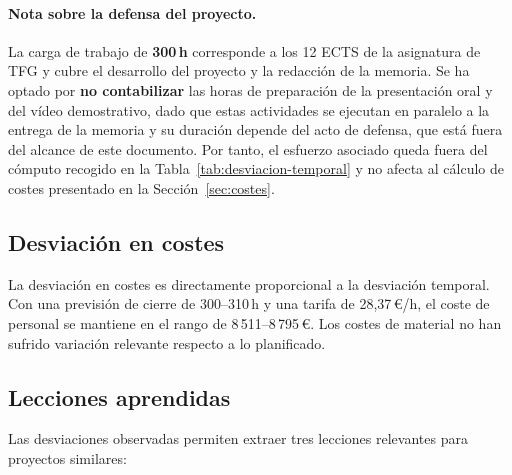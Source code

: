 \paragraph{Nota sobre la defensa del proyecto.} La carga de trabajo de \textbf{300\,h} corresponde a los 12 ECTS de la asignatura de TFG y cubre el desarrollo del proyecto y la redacción de la memoria. Se ha optado por \textbf{no contabilizar} las horas de preparación de la presentación oral y del vídeo demostrativo, dado que estas actividades se ejecutan en paralelo a la entrega de la memoria y su duración depende del acto de defensa, que está fuera del alcance de este documento. Por tanto, el esfuerzo asociado queda fuera del cómputo recogido en la Tabla~\ref{tab:desviacion-temporal} y no afecta al cálculo de costes presentado en la Sección~\ref{sec:costes}.

\subsection{Desviación en costes}

La desviación en costes es directamente proporcional a la desviación temporal. Con una previsión de cierre de 300--310\,h y una tarifa de 28,37\,€/h, el coste de personal se mantiene en el rango de 8\,511--8\,795\,€. Los costes de material no han sufrido variación relevante respecto a lo planificado.

\subsection{Lecciones aprendidas}

Las desviaciones observadas permiten extraer tres lecciones relevantes para proyectos similares:

